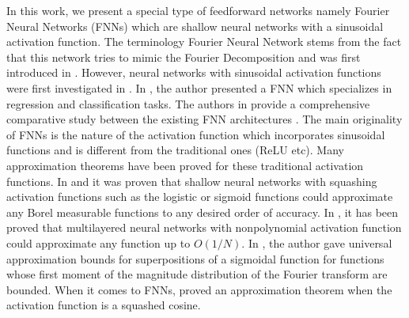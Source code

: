 \documentclass[AMS,STIX1COL]{WileyNJD-v2}
\begin{document}
In this work, we present a special type of feedforward networks namely Fourier Neural Networks (FNNs) which are shallow neural networks with a sinusoidal activation function. The terminology Fourier Neural Network stems from the fact that this network tries to mimic the Fourier Decomposition and was first introduced in \cite{Silvescu1999}. However, neural networks with sinusoidal activation functions were first investigated in \cite{Gallant1988}. In \cite{Liu2013}, the author presented a FNN which specializes in regression and classification tasks. The authors in \cite{Zhumekonov2019} provide a comprehensive comparative study between the existing FNN architectures . The main originality of FNNs is the nature of the activation function which incorporates sinusoidal functions and is different from the traditional ones (ReLU etc). Many approximation theorems have been proved for these traditional activation functions. In \cite{Cybenko1992} and \cite{HORNIK1989} it was proven that shallow neural networks with squashing activation functions such as the logistic or sigmoid functions could approximate any Borel measurable functions to any desired order of accuracy. In \cite{Leshno1993}, it has been proved that multilayered neural networks with nonpolynomial activation function could approximate any function up to $O(1/N)$. In \cite{Barron1993}, the author gave universal approximation bounds for superpositions of a sigmoidal function for functions whose first moment of the magnitude distribution of the Fourier transform are bounded. When it comes to FNNs, \cite{Gallant1988} proved an approximation theorem when the activation function is a squashed cosine.
\end{document}
